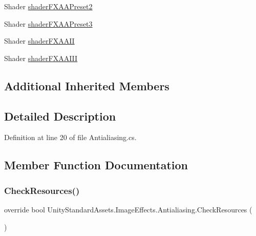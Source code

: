 \begin{DoxyCompactItemize}
\item 
Shader \mbox{\hyperlink{class_unity_standard_assets_1_1_image_effects_1_1_antialiasing_a305827d34655f147e90f4ae5afe1a21d}{shader\+F\+X\+A\+A\+Preset2}}
\item 
Shader \mbox{\hyperlink{class_unity_standard_assets_1_1_image_effects_1_1_antialiasing_aad98266da98c92c60f67adcbf7cbf450}{shader\+F\+X\+A\+A\+Preset3}}
\item 
Shader \mbox{\hyperlink{class_unity_standard_assets_1_1_image_effects_1_1_antialiasing_a3e07989445af68335b9924fa4c81714a}{shader\+F\+X\+A\+A\+II}}
\item 
Shader \mbox{\hyperlink{class_unity_standard_assets_1_1_image_effects_1_1_antialiasing_af6a43621aee746b46b9f9ee5c7373154}{shader\+F\+X\+A\+A\+I\+II}}
\end{DoxyCompactItemize}
\subsection*{Additional Inherited Members}


\subsection{Detailed Description}


Definition at line 20 of file Antialiasing.\+cs.



\subsection{Member Function Documentation}
\mbox{\label{class_unity_standard_assets_1_1_image_effects_1_1_antialiasing_a9a152887fccdeaf69e9041c84fc42051}} 
\subsubsection{\texorpdfstring{Check\+Resources()}{CheckResources()}}
{\footnotesize\ttfamily override bool Unity\+Standard\+Assets.\+Image\+Effects.\+Antialiasing.\+Check\+Resources (\begin{DoxyParamCaption}{ }\end{DoxyParamCaption})\hspace{0.3cm}{\ttfamily [virtual]}}



